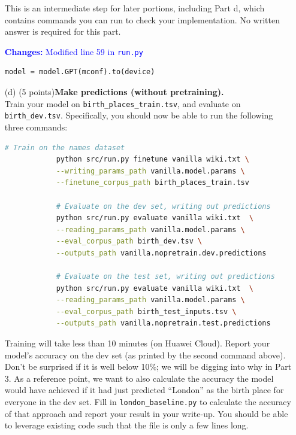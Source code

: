 \documentclass[letterpaper,12pt]{article}
\begin{document}
\begin{itemize}
		This is an intermediate step for later portions, including Part d, which contains commands you can run to check your implementation. No written answer is required for this part.
		
		\textcolor{blue}{\textbf{Changes:} Modified line 59 in \texttt{run.py}}
		\begin{lstlisting}[language=python, basicstyle=\small\ttfamily]
			model = model.GPT(mconf).to(device)
		\end{lstlisting}
		
	\item[(d)]
		(5 points)\textbf{Make predictions (without pretraining).}\\ 
		Train your model on \texttt{birth\_places\_train.tsv}, and evaluate on \texttt{birth\_dev.tsv}. Specifically, you should now be able to run the following three commands:
		\begin{lstlisting}[language=bash, basicstyle=\small\ttfamily]
			# Train on the names dataset
			python src/run.py finetune vanilla wiki.txt \
			--writing_params_path vanilla.model.params \
			--finetune_corpus_path birth_places_train.tsv
			
			# Evaluate on the dev set, writing out predictions
			python src/run.py evaluate vanilla wiki.txt  \
			--reading_params_path vanilla.model.params \
			--eval_corpus_path birth_dev.tsv \
			--outputs_path vanilla.nopretrain.dev.predictions
			
			# Evaluate on the test set, writing out predictions
			python src/run.py evaluate vanilla wiki.txt  \
			--reading_params_path vanilla.model.params \
			--eval_corpus_path birth_test_inputs.tsv \
			--outputs_path vanilla.nopretrain.test.predictions
		\end{lstlisting}
		
		Training will take less than 10 minutes (on Huawei Cloud).  Report your model's accuracy on the dev set (as printed by the second command above). Don't be surprised if it is well below 10\%; we will be digging into why in Part 3. As a reference point, we want to also calculate the accuracy the model would have achieved if it had just predicted ``London'' as the birth place for everyone in the dev set. Fill in \texttt{london\_baseline.py} to calculate the accuracy of that approach and report your result in your write-up. You should be able to leverage existing code such that the file is only a few lines long. 
		

\end{itemize}
\end{document}
